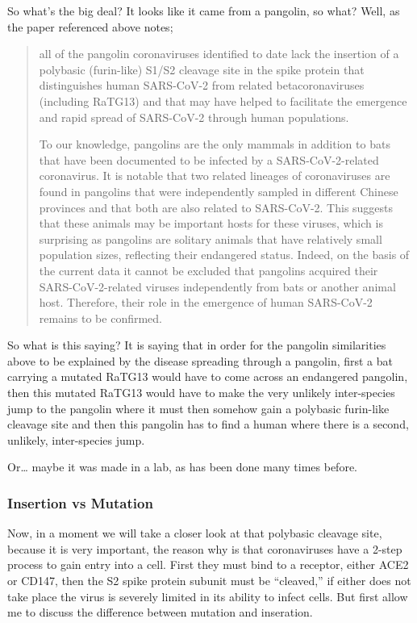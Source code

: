 \documentclass[11pt]{article}
\begin{document}
So what's the big deal? It looks like it came from a pangolin, so what? Well, as the paper referenced above notes;
\begin{quote}
all of the pangolin coronaviruses identified to date lack the insertion of a polybasic (furin-like) S1/S2 cleavage site in the spike protein that distinguishes human SARS-CoV-2 from related betacoronaviruses (including RaTG13) and that may have helped to facilitate the emergence and rapid spread of SARS-CoV-2 through human populations.

To our knowledge, pangolins are the only mammals in addition to bats that have been documented to be infected by a SARS-CoV-2-related coronavirus. It is notable that two related lineages of coronaviruses are found in pangolins that were independently sampled in different Chinese provinces and that both are also related to SARS-CoV-2. This suggests that these animals may be important hosts for these viruses, which is surprising as pangolins are solitary animals that have relatively small population sizes, reflecting their endangered status. Indeed, on the basis of the current data it cannot be excluded that pangolins acquired their SARS-CoV-2-related viruses independently from bats or another animal host. Therefore, their role in the emergence of human SARS-CoV-2 remains to be confirmed.
\end{quote}

So what is this saying? It is saying that in order for the pangolin similarities above to be explained by the disease spreading through a pangolin, first a bat carrying a mutated RaTG13 would have to come across an endangered pangolin, then this mutated RaTG13 would have to make the very unlikely inter-species jump to the pangolin where it must then somehow gain a polybasic furin-like cleavage site and then this pangolin has to find a human where there is a second, unlikely, inter-species jump.

Or\ldots{} maybe it was made in a lab, as has been done many times before.

\subsubsection{Insertion vs Mutation}
\label{sec:org74a89d2}
Now, in a moment we will take a closer look at that polybasic cleavage site, because it is very important, the reason why is that coronaviruses have a 2-step process to gain entry into a cell. First they must bind to a receptor, either ACE2 or CD147, then the S2 spike protein subunit must be ``cleaved,'' if either does not take place the virus is severely limited in its ability to infect cells. But first allow me to discuss the difference between mutation and inseration.
\end{document}
